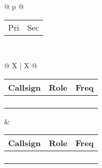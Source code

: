 {\begin{tabularx}{\textwidth}{ @{} p{\linewidth} @{} }
	\\[-3ex] \midrule
	{\begin{tabularx}{\textwidth}{@{} *{2}X @{}}
		Pri & Sec\\[-3ex]
	\end{tabularx}}\\ \midrule
	{\begin{tabularx}{\textwidth}{@{} X | X @{}}
		{\begin{tabularx}{\linewidth}{@{} *{3}X @{}}
			Callsign & Role & Freq\\[-3ex] \midrule
			\hfill & \hfill & \hfill\\ \midrule
			\hfill & \hfill & \hfill\\ \midrule
			\hfill & \hfill & \hfill\\ \midrule
			\hfill & \hfill & \hfill\\
		\end{tabularx}} &
		{\begin{tabularx}{\linewidth}{@{} *{3}X @{}}
			Callsign & Role & Freq\\[-3ex] \midrule	
			\hfill & \hfill & \hfill\\ \midrule
			\hfill & \hfill & \hfill\\ \midrule
			\hfill & \hfill & \hfill\\ \midrule
			\hfill & \hfill & \hfill\\
		\end{tabularx}}\\
	\end{tabularx}}\\ \midrule
	

\end{tabularx}}
